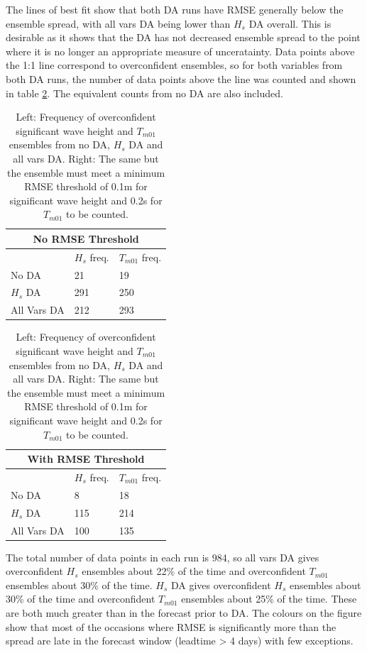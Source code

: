The lines of best fit show that both DA runs have RMSE generally below the ensemble spread, with all vars DA being lower than $H_s$ DA overall. This is desirable as it shows that the DA has not decreased ensemble spread to the point where it is no longer an appropriate measure of unceratainty. Data points above the 1:1 line correspond to overconfident ensembles, so for both variables from both DA runs, the number of data points above the line was counted and shown in table \ref{tab:conffreq}. The equivalent counts from no DA are also included.

\begin{table}
\small
\centering
\parbox{.45\textwidth}{
\begin{tabular}{|l|l|l|}
\multicolumn{3}{c}{No RMSE Threshold} \\ \hline
 & $H_s$ freq. & $T_{m01}$ freq. \\ \hline
No DA & 21 & 19 \\ \hline
$H_s$ DA & 291 & 250 \\ \hline
All Vars DA & 212 & 293 \\ \hline
\end{tabular}
} \parbox{.45\textwidth}{
\begin{tabular}{|l|l|l|}
\multicolumn{3}{c}{With RMSE Threshold} \\ \hline
 & $H_s$ freq. & $T_{m01}$ freq. \\ \hline
No DA & 8 & 18 \\ \hline
$H_s$ DA & 115 & 214 \\ \hline
All Vars DA & 100 & 135 \\ \hline
\end{tabular}
}
\caption{Left: Frequency of overconfident significant wave height and $T_{m01}$ ensembles from no DA, $H_s$ DA and all vars DA. Right: The same but the ensemble must meet a minimum RMSE threshold of 0.1m for significant wave height and 0.2s for $T_{m01}$ to be counted.}
\label{tab:conffreq}
\end{table}

The total number of data points in each run is 984, so all vars DA gives overconfident $H_s$ ensembles about 22\% of the time and overconfident $T_{m01}$ ensembles about 30\% of the time. $H_s$ DA gives overconfident $H_s$ ensembles about 30\% of the time and overconfident $T_{m01}$ ensembles about 25\% of the time. These are both much greater than in the forecast prior to DA. The colours on the figure show that most of the occasions where RMSE is significantly more than the spread are late in the forecast window (leadtime > 4 days) with few exceptions.

